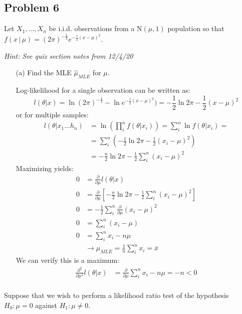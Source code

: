 \documentclass{article}
\newcommand{\1}{\mathbf{1}}
\begin{document}
\newpage
\subsection*{Problem 6}
Let $X_1, \ldots ,X_n$ be i.i.d. observations from a N$(\mu,1)$ population so that $f(x \,|\, \mu ) = (2\pi)^{-\frac{1}{2}}e^{-\frac{1}{2}(x-\mu)^2}$.\par
 {\it Hint: See quiz section notes from 12/4/20}
 
 \begin{itemize}
    \item[(a)] Find the MLE $\hat{\mu}_{MLE}$ for $\mu$.
    
    Log-likelihood for a single observation can be written as:
    $$l(\theta|x) = \ln{(2\pi)^{-\frac{1}{2}}} - \ln{e^{-\frac{1}{2}(x-\mu)^2})} = -\frac{1}{2}\ln{2\pi} - \frac{1}{2}(x-\mu)^2 $$
    or for multiple samples:
    \begin{align*}
        l(\theta|x_1\hdots h_n) &= \ln{\left(\prod_i^n f(\theta | x_i)\right)} = \sum_i^n \ln{f(\theta|x_i)} = \\
        &= \sum_i^n\left( -\frac{1}{2}\ln{2\pi} - \frac{1}{2}(x_i -\mu)^2 \right) \\
        &=  -\frac{n}{2}\ln{2\pi} - \frac{1}{2} \sum_i^n (x_i -\mu)^2
    \end{align*}
    Maximizing yields:
    \begin{align*}
        0 &= \frac{\partial}{\partial\mu} l(\theta|x) \\
        0 &= \frac{\partial}{\partial\mu} \left[  -\frac{n}{2}\ln{2\pi} - \frac{1}{2} \sum_i^n (x_i -\mu)^2 \right] \\
        0 &= - \frac{1}{2}  \sum_i^n \frac{\partial}{\partial\mu}  (x_i -\mu)^2 \\
        0 &= \sum_i^n (x_i -\mu) \\
        0 &= \sum_i^n x_i - n\mu \\
        &\rightarrow \mu_{MLE} = \frac{1}{n} \sum_i^n x_i = \bar x
    \end{align*}
    We can verify this is a maximum:
    \begin{align*}
        \frac{\partial^2}{\partial\mu^2} l(\theta|x) &= \frac{\partial}{\partial\mu} \sum_i^n x_i - n\mu = -n < 0\\
    \end{align*}
    
\end{itemize}
\newpage
\noindent Suppose that we wish to perform a likelihood ratio test of the hypothesis $H_0:\mu = 0$ against  $H_1: \mu \neq 0$.
\end{document}
